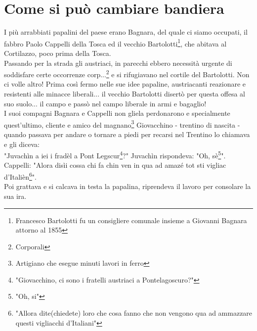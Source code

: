 \documentclass[10pt]{memoir} %
\begin{document}
\chapter{Come si può cambiare bandiera}
I più arrabbiati papalini del paese erano Bagnara, del quale ci siamo occupati, il fabbro Paolo Cappelli della Tosca ed il vecchio Bartolotti\footnote{Francesco Bartolotti fu un consigliere comunale insieme a Giovanni Bagnara attorno al 1855}, che abitava al Cortilazzo, poco prima della Tosca. \\
Passando per la strada gli austriaci, in parecchi ebbero necessità urgente di soddisfare certe occorrenze corp...\footnote{Corporali} e si rifugiavano nel cortile del Bartolotti. Non ci volle altro! Prima così fermo nelle sue idee papaline, austriacanti reazionare e resistenti alle minacce liberali... il vecchio Bartolotti disertò per questa offesa al suo suolo... il campo e passò nel campo liberale in armi e bagaglio!\\
I suoi compagni Bagnara e Cappelli non gliela perdonarono e specialmente quest'ultimo, cliente e amico del magnano\footnote{Artigiano che esegue minuti lavori in ferro} Giovacchino -  trentino di nascita - quando passava per andare o tornare a piedi per recarsi nel Trentino lo chiamava e gli diceva:\\
"Juvachìn a iei i fradèl a Pont Legscur\footnote{"Giovacchino, ci sono i fratelli austriaci a Pontelagoscuro?"}?"
Juvachìn rispondeva: "Oh, sè\footnote{"Oh, si"}".
Cappelli: "Alora disìi cossa chi fa chin ven in qua ad amazé tot sti vigliac d'Italièn\footnote{"Allora dite(chiedete) loro che cosa fanno che non vengono qua ad ammazzare questi vigliacchi d'Italiani"}".\\
Poi grattava e si calcava in testa la papalina, riprendeva il lavoro per consolare la sua ira.


\end{document}
